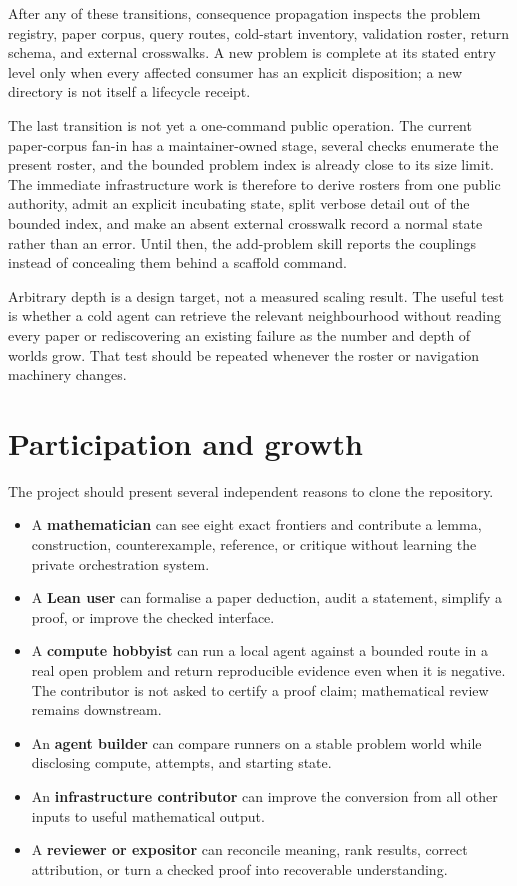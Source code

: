 \documentclass[10pt]{article}
\begin{document}
After any of these transitions, consequence propagation inspects the problem
registry, paper corpus, query routes, cold-start inventory, validation roster,
return schema, and external crosswalks. A new problem is complete at its stated
entry level only when every affected consumer has an explicit disposition; a
new directory is not itself a lifecycle receipt.

The last transition is not yet a one-command public operation.  The current
paper-corpus fan-in has a maintainer-owned stage, several checks enumerate the
present roster, and the bounded problem index is already close to its size
limit.  The immediate infrastructure work is therefore to derive rosters from
one public authority, admit an explicit incubating state, split verbose detail
out of the bounded index, and make an absent external crosswalk record a normal
state rather than an error.  Until then, the add-problem skill reports the
couplings instead of concealing them behind a scaffold command.

Arbitrary depth is a design target, not a measured scaling result.  The useful
test is whether a cold agent can retrieve the relevant neighbourhood without
reading every paper or rediscovering an existing failure as the number and
depth of worlds grow.  That test should be repeated whenever the roster or
navigation machinery changes.

\section{Participation and growth}\label{sec:growth}

The project should present several independent reasons to clone the
repository.

\begin{itemize}
\item A \textbf{mathematician} can see eight exact frontiers and contribute a
      lemma, construction, counterexample, reference, or critique without
      learning the private orchestration system.
\item A \textbf{Lean user} can formalise a paper deduction, audit a statement,
      simplify a proof, or improve the checked interface.
\item A \textbf{compute hobbyist} can run a local agent against a bounded route
      in a real open problem and return reproducible evidence even when it is
      negative.  The contributor is not asked to certify a proof claim;
      mathematical review remains downstream.
\item An \textbf{agent builder} can compare runners on a stable problem world
      while disclosing compute, attempts, and starting state.
\item An \textbf{infrastructure contributor} can improve the conversion from
      all other inputs to useful mathematical output.
\item A \textbf{reviewer or expositor} can reconcile meaning, rank results,
      correct attribution, or turn a checked proof into recoverable
      understanding.
\end{itemize}
\end{document}
